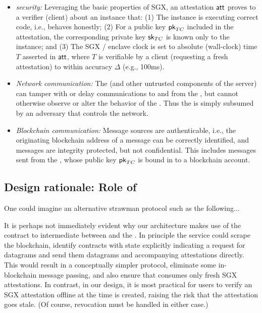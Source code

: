 \begin{itemize}
\item {\em \encname security:} Leveraging the basic properties of SGX, an attestation ${\sf att}$ proves to a verifier (client) about an \encname instance that: (1) The instance is executing correct code, i.e., behaves honestly; (2) For a public key ${\sf pk}_{TC}$ included in the attestation, the corresponding private key ${{\sf sk}_{TC}}$ is known only to the instance; and (3) The SGX / enclave clock is set to absolute (wall-clock) time $T$ asserted in ${\sf att}$, where $T$ is verifiable by a client (requesting a fresh attestation) to within accuracy $\Delta$ (e.g., 100ms).

\item {\em Network communication:} The \medname (and other untrusted components of the \tc server) can tamper with or delay communications to and from the \encname, but cannot otherwise observe or alter the behavior of the \encname. Thus the \medname is simply subsumed by an adversary that controls the network. 

\item {\em Blockchain communication:} Message sources are authenticable, i.e., the originating blockchain address of a message can be correctly identified, and messages are integrity protected, but not confidential. This includes messages sent from the \encname, whose public key ${\sf pk}_{TC}$ is bound in \tc to a blockchain account. 
\end{itemize}

\subsection{Design rationale: Role of \tcont}

One could imagine an alternative strawman protocol such as the following...

It is perhaps not immediately evident why our architecture makes use of the contract \tcont to intermediate between \reqcont and the \encname. In principle the \tc service could scrape the blockchain, identify contracts with state explicitly indicating a request for datagrams and send them datagrams and accompanying attestations directly.  This would result in a conceptually simpler protocol, eliminate some in-blockchain message passing, and also ensure that \reqcont consumes only fresh SGX attestations. In contrast, in our design, it is most practical for users to verify an SGX attestation offline at the time \reqcont is created, raising the risk that the attestation goes stale. (Of course, revocation must be handled in either case.)

